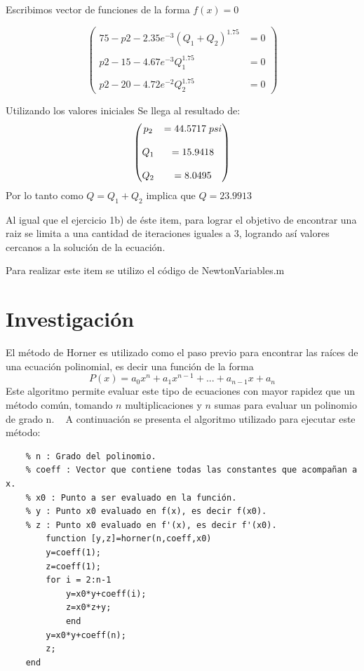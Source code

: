\documentclass{udpreport}
\begin{document}
\begin{enumerate}
    Escribimos vector de funciones de la forma $f(x) = 0$

   $$\begin{pmatrix}
        75 - p2 - 2.35e^{-3}(Q_1+Q_2)^{1.75} &= 0 \\
        \\
        p2 - 15 - 4.67e^{-3}Q_1^{1.75} &= 0  \\
        \\
        p2 - 20 - 4.72e^{-2}Q_2^{1.75} &= 0
    \end{pmatrix}$$
    
    Utilizando los valores iniciales Se llega al resultado de: 
    $$\begin{pmatrix}
        p_2 &=44.5717 \hspace{0.1cm} psi \\
        \\
        Q_1 &=15.9418 \\
        \\
        Q_2 &=8.0495
    \end{pmatrix}$$
    Por lo tanto como $Q = Q_1 + Q_2 $ implica que $ Q = 23.9913 $
    
    Al igual que el ejercicio 1b) de éste item, para lograr el objetivo de encontrar una raiz se limita a una cantidad de iteraciones iguales a 3, logrando así valores cercanos a la solución de la ecuación.
    
    Para realizar este item se utilizo el código de NewtonVariables.m
    \end{enumerate}
    \newpage
    \chapter{Investigación}
    El método de Horner es utilizado como el paso previo para encontrar las raíces de una ecuación polinomial, es decir una función de la forma $$P(x)=a_{0}x^{n}+a_{1}x^{n-1}+...+a_{n-1}x+a_{n}$$
    Este algoritmo permite evaluar este tipo de ecuaciones con mayor rapidez que un método común, tomando $n$ multiplicaciones y $n$ sumas para evaluar un polinomio de grado n.
    A continuación se presenta el algoritmo utilizado para ejecutar este método:\\
    \begin{lstlisting}
	% n : Grado del polinomio.
	% coeff : Vector que contiene todas las constantes que acompañan a x.
	% x0 : Punto a ser evaluado en la función.
	% y : Punto x0 evaluado en f(x), es decir f(x0).
	% z : Punto x0 evaluado en f'(x), es decir f'(x0).
    	function [y,z]=horner(n,coeff,x0)
		y=coeff(1);
		z=coeff(1);
   	 	for i = 2:n-1
			y=x0*y+coeff(i);
			z=x0*z+y;
    		end
		y=x0*y+coeff(n);
		z;
	end
    \end{lstlisting}
    
\end{document}
